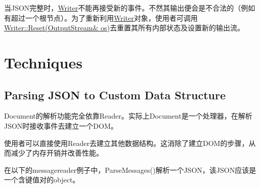 当\+J\+S\+O\+N完整时，{\ttfamily \hyperlink{class_writer}{Writer}}不能再接受新的事件。不然其输出便会是不合法的（例如有超过一个根节点）。为了重新利用{\ttfamily \hyperlink{class_writer}{Writer}}对象，使用者可调用{\ttfamily \hyperlink{class_writer_a4e5bd5e6364edca476125b511b3dca9c}{Writer\+::\+Reset(\+Output\+Stream\& os)}}去重置其所有内部状态及设置新的输出流。\hypertarget{md_Cadriciel_Commun_Externe_RapidJSON_doc_sax.zh-cn_Techniques}{}\section{Techniques}\label{md_Cadriciel_Commun_Externe_RapidJSON_doc_sax.zh-cn_Techniques}
\hypertarget{md_Cadriciel_Commun_Externe_RapidJSON_doc_sax.zh-cn_CustomDataStructure}{}\subsection{Parsing J\+S\+O\+N to Custom Data Structure}\label{md_Cadriciel_Commun_Externe_RapidJSON_doc_sax.zh-cn_CustomDataStructure}
{\ttfamily Document}的解析功能完全依靠{\ttfamily Reader}。实际上{\ttfamily Document}是一个处理器，在解析\+J\+S\+O\+N时接收事件去建立一个\+D\+O\+M。

使用者可以直接使用{\ttfamily Reader}去建立其他数据结构。这消除了建立\+D\+O\+M的步骤，从而减少了内存开销并改善性能。

在以下的{\ttfamily messagereader}例子中，{\ttfamily Parse\+Messages()}解析一个\+J\+S\+O\+N，该\+J\+S\+O\+N应该是一个含键值对的object。



